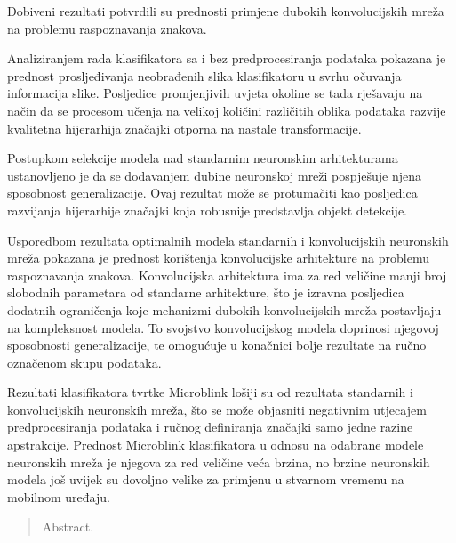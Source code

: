 \documentclass[lmodern, utf8, diplomski, numeric]{fer}
\begin{document}
Dobiveni rezultati potvrdili su prednosti primjene dubokih konvolucijskih mreža na problemu raspoznavanja znakova. 

Analiziranjem rada klasifikatora sa i bez predprocesiranja podataka pokazana je prednost prosljeđivanja neobrađenih slika klasifikatoru u svrhu očuvanja informacija slike. Posljedice promjenjivih uvjeta okoline se tada rješavaju na način da se procesom učenja na velikoj količini različitih oblika podataka razvije kvalitetna hijerarhija značajki otporna na nastale transformacije.

Postupkom selekcije modela nad standarnim neuronskim arhitekturama ustanovljeno je da se dodavanjem dubine neuronskoj mreži pospješuje njena sposobnost generalizacije. Ovaj rezultat može se protumačiti kao posljedica razvijanja hijerarhije značajki koja robusnije predstavlja objekt detekcije. 

Usporedbom rezultata optimalnih modela standarnih i konvolucijskih neuronskih mreža pokazana je prednost korištenja konvolucijske arhitekture na problemu raspoznavanja znakova. Konvolucijska arhitektura ima za red veličine manji broj slobodnih parametara od standarne arhitekture, što je izravna posljedica dodatnih ograničenja koje mehanizmi dubokih konvolucijskih mreža postavljaju na kompleksnost modela. To svojstvo konvolucijskog modela doprinosi njegovoj sposobnosti generalizacije, te omogućuje u konačnici bolje rezultate na ručno označenom skupu podataka.

Rezultati klasifikatora tvrtke Microblink lošiji su od rezultata standarnih i konvolucijskih neuronskih mreža, što se može objasniti negativnim utjecajem predprocesiranja podataka i ručnog definiranja značajki samo jedne razine apstrakcije. Prednost Microblink klasifikatora u odnosu na odabrane modele neuronskih mreža je njegova za red veličine veća brzina, no brzine neuronskih modela još uvijek su dovoljno velike za primjenu u stvarnom vremenu na mobilnom uređaju. 




\begin{sazetak}


\end{sazetak}

\begin{abstract}
Abstract.

\end{abstract}
\end{document}
